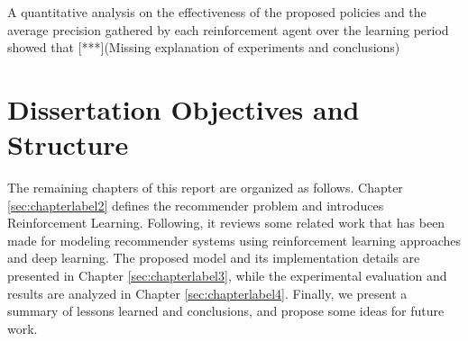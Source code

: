 A quantitative analysis on the effectiveness of the proposed policies and the average precision gathered by each reinforcement agent over the learning period showed that [***](Missing explanation of experiments and conclusions)

\section{Dissertation Objectives and Structure}

The remaining chapters of this report are organized as follows. Chapter \ref{sec:chapterlabel2} defines the recommender problem and introduces Reinforcement Learning. Following, it reviews some related work that has been made for modeling recommender systems using reinforcement learning approaches and deep learning. The proposed model and its implementation details are presented in Chapter \ref{sec:chapterlabel3}, while the experimental evaluation and results are analyzed in Chapter \ref{sec:chapterlabel4}. Finally, we present a summary of lessons learned and conclusions, and propose some ideas for future work.


